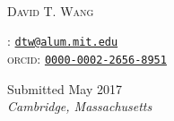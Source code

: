 \documentclass[11pt,twoside,final]{memoir} 	%
\begin{document}
	\cleartoevenpage
	
	\thispagestyle{empty}
	\vspace*{0.3\textheight}
	
	\noindent {}\\
	
	\vspace{12pt}
	
	\noindent \textsc{David T. Wang}  
	
	\vspace{6pt}
	
	: \href{mailto:dtw@alum.mit.edu}{\nolinkurl{dtw@alum.mit.edu}}\\
	{\textsc{orcid}}: \noindent\href{http://orcid.org/0000-0002-2656-8951}{\nolinkurl{0000-0002-2656-8951}}\\
	
	\vspace{12pt}
	
	\noindent Submitted  May 2017\\
	\noindent\textit{Cambridge, Massachusetts}\\
	
	\vspace*{\fill}
	
	
	
	
\end{document}
